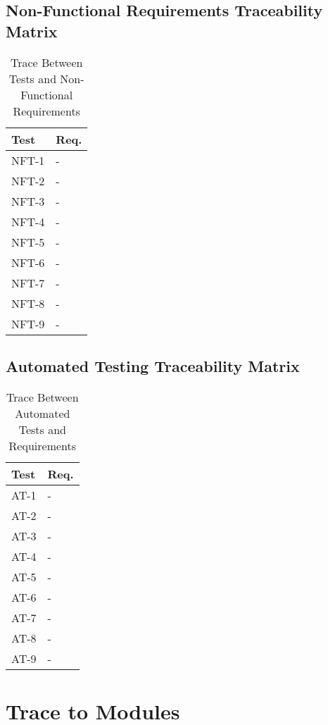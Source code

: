\documentclass[12pt, titlepage]{article}
\begin{document}
\subsection{Non-Functional Requirements Traceability Matrix}
\begin{table}[H]
\centering
\begin{tabular}{p{} p{}}
\toprule
\textbf{Test} & \textbf{Req.}\\
\midrule
NFT-1 & -\\
NFT-2 & -\\
NFT-3 & -\\
NFT-4 & -\\
NFT-5 & -\\
NFT-6 & -\\
NFT-7 & -\\
NFT-8 & -\\
NFT-9 & -\\
\bottomrule
\end{tabular}
\caption{Trace Between Tests and Non-Functional Requirements}
\label{TblTNFR}
\end{table}

\newpage

\subsection{Automated Testing Traceability Matrix}
\begin{table}[H]
\centering
\begin{tabular}{p{} p{}}
\toprule
\textbf{Test} & \textbf{Req.}\\
\midrule
AT-1 & -\\
AT-2 & -\\
AT-3 & -\\
AT-4 & -\\
AT-5 & -\\
AT-6 & -\\
AT-7 & -\\
AT-8 & -\\
AT-9 & -\\
\bottomrule
\end{tabular}
\caption{Trace Between Automated Tests and Requirements}
\label{TblTATR}
\end{table}

\newpage

\section{Trace to Modules}
\end{document}
